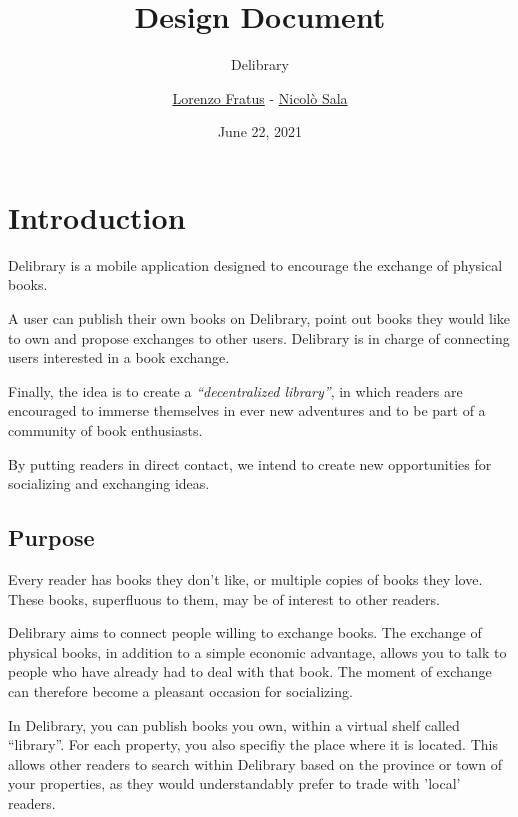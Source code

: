 
\graphicspath{ {assets/} }

\title{Design Document}
\subtitle{Delibrary}
\author{\href{https://github.com/lorenzofratus}{Lorenzo Fratus} - \href{https://github.com/nicheosala}{Nicolò Sala}}
\date{June 22, 2021}



\maketitle
\tableofcontents



\chapter{Introduction}
Delibrary is a mobile application designed to encourage the exchange of physical books.

A user can publish their own books on Delibrary, point out books they would like to own and propose exchanges to other users.
Delibrary is in charge of connecting users interested in a book exchange.

Finally, the idea is to create a \emph{``decentralized library''}, in which readers are encouraged to immerse themselves
in ever new adventures and to be part of a community of book enthusiasts.

By putting readers in direct contact, we intend to create new opportunities for socializing and exchanging ideas.

\section{Purpose}
Every reader has books they don't like, or multiple copies of books they love.
These books, superfluous to them, may be of interest to other readers.

Delibrary aims to connect people willing to exchange books.
The exchange of physical books, in addition to a simple economic advantage, allows you to talk to people who have already had to deal with that book.
The moment of exchange can therefore become a pleasant occasion for socializing.

In Delibrary, you can publish books you own, within a virtual shelf called ``library''.
For each property, you also specifiy the place where it is located. This allows other readers to search within Delibrary based on the province or town of your properties,
as they would understandably prefer to trade with 'local' readers.

